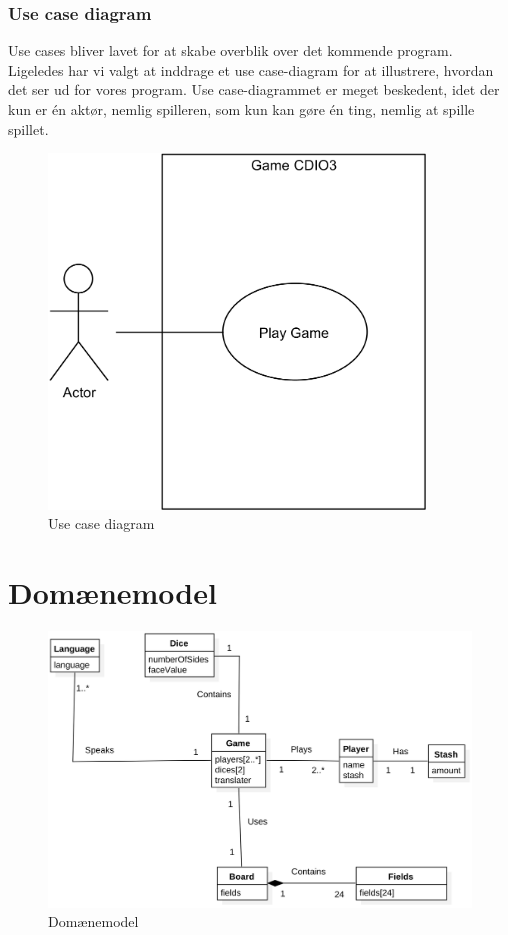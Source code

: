 \subsubsection{Use case diagram}
Use cases bliver lavet for at skabe overblik over det kommende program.
Ligeledes har vi valgt at inddrage et use case-diagram for at illustrere, hvordan det ser ud for vores program.
Use case-diagrammet er meget beskedent, idet der kun er én aktør, nemlig spilleren, som kun kan gøre én ting, nemlig at spille spillet.
\begin{figure}[H]
    \begin{center}
        \includegraphics[width=10cm]{graphics/usecases/UseCase1.png}
        \caption{Use case diagram}
        \label{fig:use_case_diagram}
    \end{center}
\end{figure}

\pagebreak
\section{Domænemodel}

\begin{figure}[H]
    \begin{center}
        \includegraphics[width=\columnwidth]{graphics/domain/Domainmodel.png}
        \caption{Domænemodel}
        \label{fig:use_case_diagram}
    \end{center}
\end{figure}